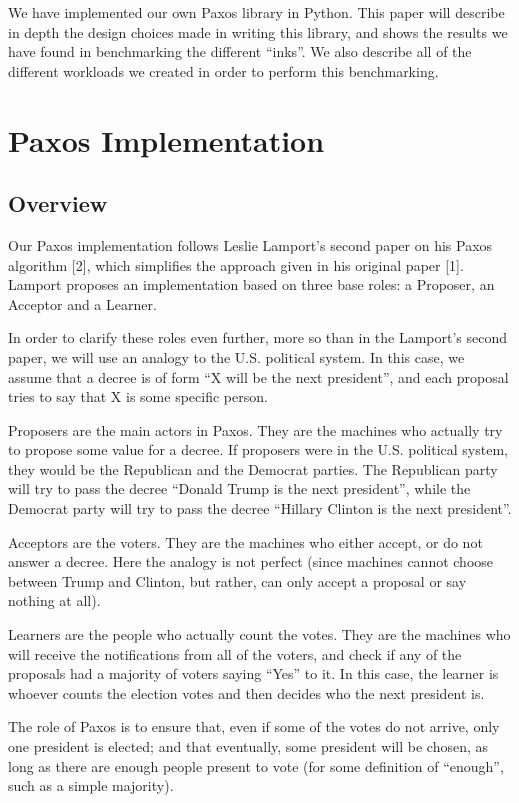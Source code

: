 \documentclass[12pt,]{article}
\begin{document}
We have implemented our own Paxos library in Python. This paper will
describe in depth the design choices made in writing this library, and
shows the results we have found in benchmarking the different ``inks''.
We also describe all of the different workloads we created in order to
perform this benchmarking.

\section{Paxos Implementation}\label{paxos-implementation}

\subsection{Overview}\label{overview}

Our Paxos implementation follows Leslie Lamport's second paper on his
Paxos algorithm {[}2{]}, which simplifies the approach given in his
original paper {[}1{]}. Lamport proposes an implementation based on
three base roles: a Proposer, an Acceptor and a Learner.

In order to clarify these roles even further, more so than in the
Lamport's second paper, we will use an analogy to the U.S. political
system. In this case, we assume that a decree is of form ``X will be the
next president'', and each proposal tries to say that X is some specific
person.

Proposers are the main actors in Paxos. They are the machines who
actually try to propose some value for a decree. If proposers were in
the U.S. political system, they would be the Republican and the Democrat
parties. The Republican party will try to pass the decree ``Donald Trump
is the next president'', while the Democrat party will try to pass the
decree ``Hillary Clinton is the next president''.

Acceptors are the voters. They are the machines who either accept, or do
not answer a decree. Here the analogy is not perfect (since machines
cannot choose between Trump and Clinton, but rather, can only accept a
proposal or say nothing at all).

Learners are the people who actually count the votes. They are the
machines who will receive the notifications from all of the voters, and
check if any of the proposals had a majority of voters saying ``Yes'' to
it. In this case, the learner is whoever counts the election votes and
then decides who the next president is.

The role of Paxos is to ensure that, even if some of the votes do not
arrive, only one president is elected; and that eventually, some
president will be chosen, as long as there are enough people present to
vote (for some definition of ``enough'', such as a simple majority).
\end{document}
